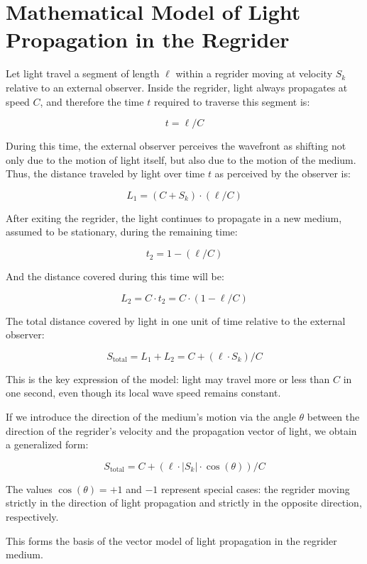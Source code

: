 \documentclass[12pt]{article}
\begin{document}
\section*{Mathematical Model of Light Propagation in the Regrider}

Let light travel a segment of length $\ell$ within a regrider moving at velocity $S_k$ relative to an external observer. Inside the regrider, light always propagates at speed $C$, and therefore the time $t$ required to traverse this segment is:

\[
t = \ell / C
\]

During this time, the external observer perceives the wavefront as shifting not only due to the motion of light itself, but also due to the motion of the medium. Thus, the distance traveled by light over time $t$ as perceived by the observer is:

\[
L_1 = (C + S_k) \cdot (\ell / C)
\]

After exiting the regrider, the light continues to propagate in a new medium, assumed to be stationary, during the remaining time:

\[
t_2 = 1 - (\ell / C)
\]

And the distance covered during this time will be:

\[
L_2 = C \cdot t_2 = C \cdot (1 - \ell / C)
\]

The total distance covered by light in one unit of time relative to the external observer:

\[
S_{\text{total}} = L_1 + L_2 = C + (\ell \cdot S_k) / C
\]

This is the key expression of the model: light may travel more or less than $C$ in one second, even though its local wave speed remains constant.
\par
If we introduce the direction of the medium's motion via the angle $\theta$ between the direction of the regrider's velocity and the propagation vector of light, we obtain a generalized form:

\[
S_{\text{total}} = C + (\ell \cdot \left|S_k\right| \cdot \cos(\theta)) / C
\]

The values $\cos(\theta) = +1$ and $-1$ represent special cases: the regrider moving strictly in the direction of light propagation and strictly in the opposite direction, respectively.
\par
This forms the basis of the vector model of light propagation in the regrider medium.
\end{document}
